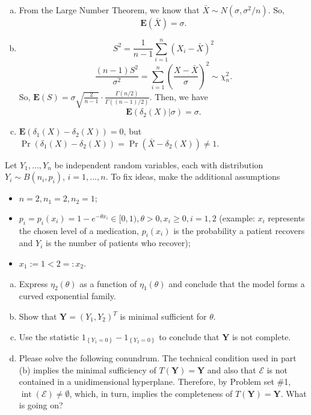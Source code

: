 \begin{solution}
    \begin{enumerate}[(a)]
        \item From the Large Number Theorem, we know that $\bar{X}\sim N(\sigma, \sigma^2/n)$. So, 
        \[
            \mathbf{E}(\bar{X})=\sigma. 
        \]
        \item \[S^2=\frac{1}{n-1}\sum_{i=1}^n(X_i-\bar{X})^2\]
        \[
            \frac{(n-1)S^2}{\sigma^2}=\sum_{i=1}^n(\frac{X-\bar{X}}{\sigma})^2\sim\chi_n^2. 
        \]
        So, $\mathbf{E}(S)=\sigma\sqrt{\frac{2}{n-1}}\cdot \frac{\Gamma(n/2)}{\Gamma((n-1)/2)}$. Then, we have
        \[
            \mathbf{E}(\delta_2(X)|\sigma)=\sigma. 
        \]
        \item $\mathbf{E}(\delta_1(X)-\delta_2(X))=0$, but $\Pr(\delta_1(X)-\delta_2(X))=\Pr(\bar{X}-\delta_2(X))\neq 1$. 
    \end{enumerate}
\end{solution}

\begin{exercise}
    Let \(Y_{1}, \ldots, Y_{n}\) be independent random variables, each with distribution \(Y_{i} \sim B\left(n_{i}, p_{i}\right)\), \(i=1, \ldots, n\). To fix ideas, make the additional assumptions
    \begin{itemize}
        \item \(n=2, n_{1}=2, n_{2}=1 ;\)
        \item \(p_{i}=p_{i}\left(x_{i}\right)=1-e^{-\theta x_{i}} \in[0,1), \theta>0, x_{i} \geq 0, i=1,2\) (example: \(x_{i}\) represents the chosen level of a medication, \(p_{i}\left(x_{i}\right)\) is the probability a patient recovers and \(Y_{i}\) is the number of patients who recover); 
        \item \(x_{1}:=1<2=: x_{2}\).
    \end{itemize}
    \begin{enumerate}[(a)]
        \item Express \(\eta_{2}(\theta)\) as a function of \(\eta_{1}(\theta)\) and conclude that the model forms a curved exponential family. 
        \item Show that \(\mathbf{Y}=\left(Y_{1}, Y_{2}\right)^{T}\) is minimal sufficient for \(\theta\). 
        \item Use the statistic \(1_{\left\{Y_{1}=0\right\}}-1_{\left\{Y_{2}=0\right\}}\) to conclude that \(\mathbf{Y}\) is not complete. 
        \item Please solve the following conundrum. The technical condition used in part (b) implies the minimal sufficiency of \(T(\mathbf{Y})=\mathbf{Y}\) and also that \(\mathcal{E}\) is not contained in a unidimensional hyperplane. Therefore, by Problem set \#1, \(\operatorname{int}(\mathcal{E}) \neq \emptyset\), which, in turn, implies the completeness of \(T(\mathbf{Y})=\mathbf{Y}\). What is going on? 
    \end{enumerate}
\end{exercise}

